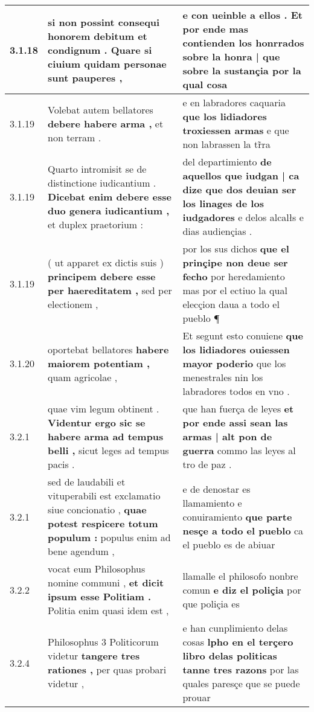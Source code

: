 \begin{tabular}{|p{1cm}|p{6.5cm}|p{6.5cm}|}
3.1.18 & si non possint \textbf{ consequi honorem debitum et condignum . } Quare si ciuium quidam personae sunt pauperes , & e con ueinble a ellos . \textbf{ Et por ende mas contienden los honrrados sobre la honra | que sobre la sustançia } por la qual cosa \\\hline
3.1.19 & Volebat autem bellatores \textbf{ debere habere arma , } et non terram . & e en labradores caquaria \textbf{ que los lidiadores troxiessen armas } e que non labrassen la tr̃ra \\\hline
3.1.19 & Quarto intromisit se de distinctione iudicantium . \textbf{ Dicebat enim debere esse duo genera iudicantium , } et duplex praetorium : & del departimiento \textbf{ de aquellos que iudgan | ca dize que dos deuian ser los linages de los iudgadores } e delos alcalłs e dias audiençias . \\\hline
3.1.19 & ( ut apparet ex dictis suis ) \textbf{ principem debere esse per haereditatem , } sed per electionem , & por los sus dichos \textbf{ que el prinçipe non deue ser fecho } por heredamiento mas por el ectiuo la qual elecçion daua a todo el pueblo ¶ \\\hline
3.1.20 & oportebat bellatores \textbf{ habere maiorem potentiam , } quam agricolae , & Et segunt esto conuiene \textbf{ que los lidiadores ouiessen mayor poderio } que los menestrales nin los labradores todos en vno . \\\hline
3.2.1 & quae vim legum obtinent . \textbf{ Videntur ergo sic se habere arma ad tempus belli , } sicut leges ad tempus pacis . & que han fuerça de leyes \textbf{ et por ende assi sean las armas | alt pon de guerra } commo las leyes al tro de paz . \\\hline
3.2.1 & sed de laudabili et vituperabili est exclamatio siue concionatio , \textbf{ quae potest respicere totum populum : } populus enim ad bene agendum , & e de denostar es llamamiento e conuiramiento \textbf{ que parte nesçe a todo el pueblo } ca el pueblo es de abiuar \\\hline
3.2.2 & vocat eum Philosophus nomine communi , \textbf{ et dicit ipsum esse Politiam . } Politia enim quasi idem est , & llamalle el philosofo nonbre comun \textbf{ e diz el poliçia } por que poliçia es \\\hline
3.2.4 & Philosophus 3 Politicorum videtur \textbf{ tangere tres rationes , } per quas probari videtur , & e han cunplimiento delas cosas \textbf{ lpho en el terçero libro delas politicas tanne tres razons } por las quales paresçe que se puede prouar \\\hline

\end{tabular}

